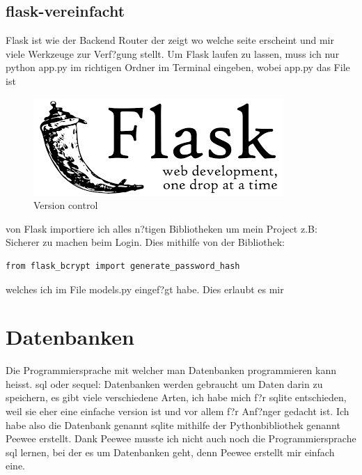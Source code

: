 \documentclass{article}
\begin{document}
\subsection{flask-vereinfacht}
Flask ist wie der Backend Router der zeigt wo welche seite erscheint und mir viele Werkzeuge zur Verf?gung stellt.
Um Flask laufen zu lassen, muss ich nur python app.py im richtigen Ordner im Terminal eingeben, wobei app.py das File ist


\begin{figure}[ht]
    \centering
    \includegraphics[width=.5\linewidth]{flask}
    \caption{Version control}
    \label{fig:sub1}
    \end{figure}

von Flask importiere ich alles n?tigen Bibliotheken um mein Project z.B:\\
Sicherer zu machen beim Login. Dies mithilfe von der Bibliothek:
\begin{lstlisting}
from flask_bcrypt import generate_password_hash
\end{lstlisting}
welches ich im File models.py eingef?gt habe.
Dies erlaubt es mir



\cleardoublepage

\section{Datenbanken}
Die Programmiersprache mit welcher man Datenbanken programmieren kann heisst. sql oder sequel:
Datenbanken werden gebraucht um Daten darin zu speichern, es gibt viele verschiedene Arten, ich habe mich f?r sqlite entschieden, weil sie eher eine einfache version ist und vor allem f?r Anf?nger gedacht ist.
Ich habe also die Datenbank genannt sqlite mithilfe der Pythonbibliothek genannt Peewee erstellt.
Dank Peewee musste ich nicht auch noch die Programmiersprache sql lernen, bei der es um Datenbanken geht, denn Peewee erstellt mir einfach eine.
\end{document}
